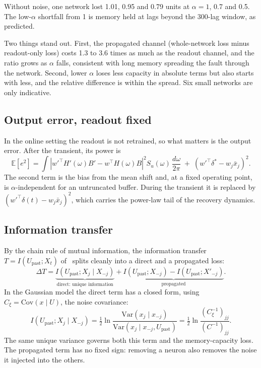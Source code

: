 \documentclass[11pt,a4paper]{article}
\newcommand{\E}{\mathbb{E}}
\newcommand{\Var}{\mathrm{Var}}
\newcommand{\Cov}{\mathrm{Cov}}
\newcommand{\xb}{\bar x}
\newcommand{\upast}{U_{\mathrm{past}}}
\begin{document}
Without noise, one network lost 1.01, 0.95 and 0.79 units at $\alpha = 1$, 0.7 and 0.5. The low-$\alpha$ shortfall from 1 is memory held at lags beyond the 300-lag window, as predicted.

Two things stand out. First, the propagated channel (whole-network loss minus readout-only loss) costs 1.3 to 3.6 times as much as the readout channel, and the ratio grows as $\alpha$ falls, consistent with long memory spreading the fault through the network. Second, lower $\alpha$ loses less capacity in absolute terms but also starts with less, and the relative difference is within the spread. Six small networks are only indicative.

\subsection{Output error, readout fixed}

In the online setting the readout is not retrained, so what matters is the output error. After the transient, its power is
\begin{equation}
\E[e^{2}] = \int \left| w'^{\top} H'(\omega) B' - w^{\top} H(\omega) B \right|^{2} S_u(\omega)\, \frac{d\omega}{2\pi} \; + \; \left( w'^{\top} \delta^{*} - w_j \xb_j \right)^{2}.
\label{eq:errpower}
\end{equation}
The second term is the bias from the mean shift and, at a fixed operating point, is $\alpha$-independent for an untruncated buffer. During the transient it is replaced by $(w'^{\top}\delta(t) - w_j\xb_j)^2$, which carries the power-law tail of the recovery dynamics.

\subsection{Information transfer}

By the chain rule of mutual information, the information transfer $T = I(\upast; X_t)$ of~\cite{mastin2026} splits cleanly into a direct and a propagated loss:
\begin{equation}
\Delta T = \underbrace{I(\upast; X_j \mid X_{-j})}_{\text{direct: unique information}} + \underbrace{I(\upast; X_{-j}) - I(\upast; X'_{-j})}_{\text{propagated}}.
\label{eq:dT}
\end{equation}
In the Gaussian model the direct term has a closed form, using $C_{\xi} = \Cov(x \mid U)$, the noise covariance:
\begin{equation}
I(\upast; X_j \mid X_{-j}) = \tfrac{1}{2} \ln \frac{\Var(x_j \mid x_{-j})}{\Var(x_j \mid x_{-j}, \upast)} = \tfrac{1}{2} \ln \frac{(C_{\xi}^{-1})_{jj}}{(C^{-1})_{jj}}.
\label{eq:cmi}
\end{equation}
The same unique variance governs both this term and the memory-capacity loss. The propagated term has no fixed sign: removing a neuron also removes the noise it injected into the others.
\end{document}
